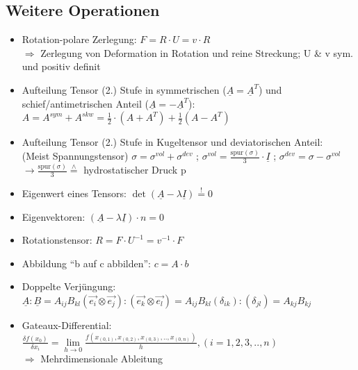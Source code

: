 \documentclass[fleqn,twoside]{article}
\begin{document}
\subsection{Weitere Operationen}
\begin{itemize}
	 \item Rotation-polare Zerlegung: $F=R\cdot U = v\cdot R$\\ 
	 $\Rightarrow$ Zerlegung von Deformation in Rotation und reine Streckung; U \& v sym. und positiv definit
	 \item Aufteilung Tensor (2.) Stufe in symmetrischen ($\underline{A}=\underline{A}^T$) und schief/antimetrischen Anteil ($\underline{A}=-\underline{A}^T$):\\
	 $A=A^{sym}+A^{skw} = \frac12 \cdot (A+A^T) + \frac12 (A-A^T)$
	 \item Aufteilung Tensor (2.) Stufe in Kugeltensor und deviatorischen Anteil:\\
	 (Meist Spannungstensor) $\sigma=\sigma^{vol}+\sigma^{dev}$ ; $\sigma^{vol}=\frac{\text{spur}(\sigma)}{3}\cdot \underline{I}$ ; $\sigma^{dev} = \sigma-\sigma^{vol}$\\ $\rightarrow \frac{\text{spur}(\sigma)}{3}\overset{\wedge}{=}$ hydrostatischer Druck p
        \item Eigenwert eines Tensors: $\det(\underline{A} - \lambda\underline{I}) \overset{!}{=} 0$
        \item Eigenvektoren: $(\underline{A}-\lambda\underline{I})\cdot n = 0$
        \item Rotationstensor: $R=F\cdot U^{-1}=v^{-1}\cdot F$
        \item Abbildung \enquote{b auf c abbilden}: $c=A\cdot b$
        \item Doppelte Verjüngung: $\underline{A}:\underline{B} = A_{ij}B_{kl}(\overset{\rightarrow}{e_i}\otimes\overset{\rightarrow}{e_j}):(\overset{\rightarrow}{e_k}\otimes\overset{\rightarrow}{e_l}) = A_{ij}B_{kl}(\delta_{ik}):(\delta_{jl}) = A_{kj}B_{kj}$
        \item Gateaux-Differential: $\frac{\delta f(x_0)}{\delta x_i} = \underset{h\rightarrow 0}{\lim} \frac{f(x_{(0,1)},x_{(0,2)},x_{(0,3)},..,x_{(0,n)})}{h} , (i=1,2,3,..,n)$\\ $\Rightarrow$ Mehrdimensionale Ableitung
\end{itemize}
\end{document}
